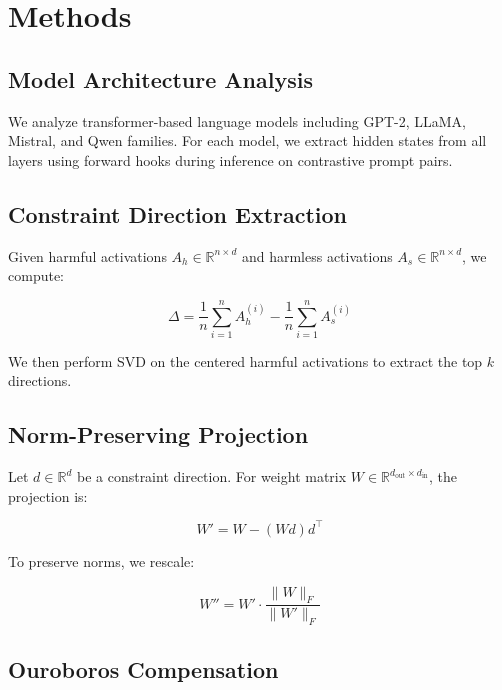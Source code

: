 \section{Methods}

\subsection{Model Architecture Analysis}

We analyze transformer-based language models including GPT-2, LLaMA, Mistral, and Qwen families. For each model, we extract hidden states from all layers using forward hooks during inference on contrastive prompt pairs.

\subsection{Constraint Direction Extraction}

Given harmful activations $A_h \in \mathbb{R}^{n \times d}$ and harmless activations $A_s \in \mathbb{R}^{n \times d}$, we compute:

\begin{equation}
\Delta = \frac{1}{n}\sum_{i=1}^n A_h^{(i)} - \frac{1}{n}\sum_{i=1}^n A_s^{(i)}
\end{equation}

We then perform SVD on the centered harmful activations to extract the top $k$ directions.

\subsection{Norm-Preserving Projection}

Let $d \in \mathbb{R}^d$ be a constraint direction. For weight matrix $W \in \mathbb{R}^{d_{\text{out}} \times d_{\text{in}}}$, the projection is:

\begin{equation}
W' = W - (W d) d^\top
\end{equation}

To preserve norms, we rescale:

\begin{equation}
W'' = W' \cdot \frac{\|W\|_F}{\|W'\|_F}
\end{equation}

\subsection{Ouroboros Compensation}

